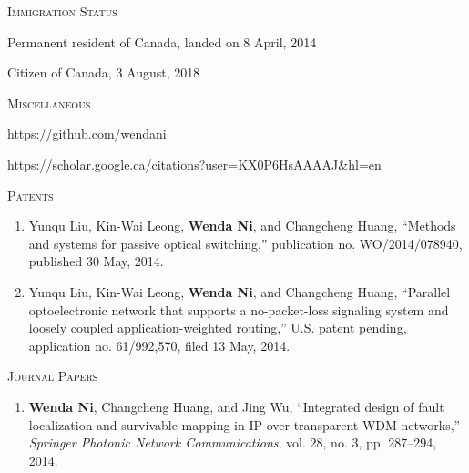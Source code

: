 \documentclass[letterpaper,11pt]{article}
\newcommand{\resheading}[1]{{\noindent\large \colorbox{mygrey}{
\begin{minipage}{1.0\textwidth}{\textsc{#1 \vphantom{p\^{E}}}}\end{minipage}}}}
\begin{document}
\begin{CJK}{UTF8}{gbsn}
\begin{itemize}
\end{itemize}




\resheading{Immigration Status}%
\vspace{0.15in} %

\leftskip 0.2in %

Permanent resident of Canada, landed on 8 April, 2014

Citizen of Canada, 3 August, 2018

\leftskip 0.0in




\vspace{0.1in}
\resheading{Miscellaneous}
\begin{description}
\setlength{\itemindent}{-0.1in}
\item[GitHub:] https://github.com/wendani

\item[Google Scholar:] https://scholar.google.ca/citations?user=KX0P6HsAAAAJ\&hl=en
\end{description}




\resheading{Patents}%
\begin{enumerate}
\item
Yunqu Liu, Kin-Wai Leong, \textbf{Wenda Ni}, and Changcheng Huang, ``Methods and systems for passive optical switching,'' publication no. WO/2014/078940, published 30 May, 2014.

\item
Yunqu Liu, Kin-Wai Leong, \textbf{Wenda Ni}, and Changcheng Huang, ``Parallel optoelectronic network that supports a no-packet-loss signaling system and loosely coupled application-weighted routing,'' U.S. patent pending, application no. 61/992,570, filed 13 May, 2014.
\end{enumerate}




\resheading{Journal Papers}%
\begin{enumerate}

\item
\textbf{Wenda Ni}, Changcheng Huang, and Jing Wu, ``Integrated design of fault localization and survivable mapping in IP over transparent WDM networks,'' \textit{Springer Photonic Network Communications}, vol. 28, no. 3, pp. 287--294, 2014.


\end{enumerate}
\end{CJK}
\end{document}
